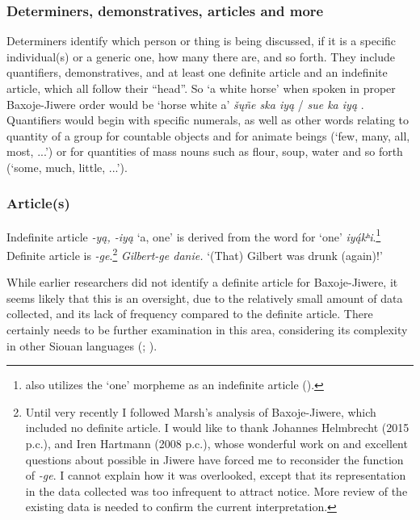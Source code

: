 \documentclass[output=paper]{LSP/langsci}
\begin{document}
\subsubsection{Determiners, demonstratives, articles and more} 
Determiners identify which person or thing is being discussed, if it is a specific individual(s) or a generic one, how many there are, and so forth.  They include quantifiers, demonstratives, and at least one definite article and an indefinite article, which all follow their ``head''.  So `a white horse' when spoken in proper Baxoje-Jiwere order would be `horse white a' \textit{\v{s}\k{u}ñe ska iy\k{a}}  / \textit{sue ka iy\k{a}} .  Quantifiers would begin with specific numerals, as well as other words relating to quantity of a group for countable objects and for animate beings (`few, many, all, most, ...') or for quantities of mass nouns such as flour, soup, water and so forth (`some, much, little, ...').   

\subsubsection{Article(s)}  

Indefinite article \textit{-y\k{a}, -iy\k{a}} `a, one' is derived from the word for `one' \textit{iy\k{á}kʰi}.\footnote{ also utilizes the `one' morpheme as an indefinite article (\citealt[755-756]{Ullrich2008}).} Definite article is \textit{-ge}.\footnote{Until very recently I followed Marsh's \citeyearpar{Marsh1936} analysis of Baxoje-Jiwere, which included no definite article. I would like to thank Johannes Helmbrecht (2015 p.c.), and Iren Hartmann (2008 p.c.), whose wonderful work on  and excellent questions about possible  in Jiwere have forced me to reconsider the function of \textit{-ge}. I cannot explain how it was overlooked, except that its representation in the data collected was too infrequent to attract notice. More review of the existing data is needed to confirm the current interpretation.}   \textit{Gilbert-ge danie.}  `(That) Gilbert was drunk (again)!'

While earlier researchers did not identify a definite article for Baxoje-Jiwere, it seems likely that this is an oversight, due to the relatively small amount of data collected, and its lack of frequency compared to the  definite article. There certainly needs to be further examination in this area, considering its complexity in other Siouan languages (\citealt{Rankin1977,Rankin2005b}; \citealt[455]{RoodTaylor1996}).  
\end{document}
